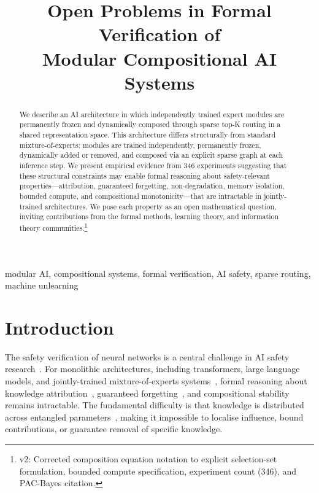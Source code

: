 \documentclass[conference]{IEEEtran}
\title{Open Problems in Formal Verification of\\Modular Compositional AI Systems}
\author{\IEEEauthorblockN{Kim Daniel Schulte-Zurhausen}
\IEEEauthorblockA{Modulith Research CIC, London, UK\\
research@modulith.ai}}
\begin{document}
\maketitle

\begin{abstract}
We describe an AI architecture in which independently trained expert modules are permanently frozen and dynamically composed through sparse top-K routing in a shared representation space. This architecture differs structurally from standard mixture-of-experts: modules are trained independently, permanently frozen, dynamically added or removed, and composed via an explicit sparse graph at each inference step. We present empirical evidence from 346 experiments suggesting that these structural constraints may enable formal reasoning about safety-relevant properties---attribution, guaranteed forgetting, non-degradation, memory isolation, bounded compute, and compositional monotonicity---that are intractable in jointly-trained architectures. We pose each property as an open mathematical question, inviting contributions from the formal methods, learning theory, and information theory communities.\footnote{v2: Corrected composition equation notation to explicit selection-set formulation, bounded compute specification, experiment count (346), and PAC-Bayes citation.}
\end{abstract}

\begin{IEEEkeywords}
modular AI, compositional systems, formal verification, AI safety, sparse routing, machine unlearning
\end{IEEEkeywords}

\section{Introduction}

The safety verification of neural networks is a central challenge in AI safety research~\cite{amodei2016concrete}. For monolithic architectures, including transformers, large language models, and jointly-trained mixture-of-experts systems~\cite{fedus2022switch,shazeer2017outrageously}, formal reasoning about knowledge attribution~\cite{sundararajan2017axiomatic}, guaranteed forgetting~\cite{bourtoule2021machine}, and compositional stability remains intractable. The fundamental difficulty is that knowledge is distributed across entangled parameters~\cite{bricken2023monosemanticity}, making it impossible to localise influence, bound contributions, or guarantee removal of specific knowledge.
\end{document}

